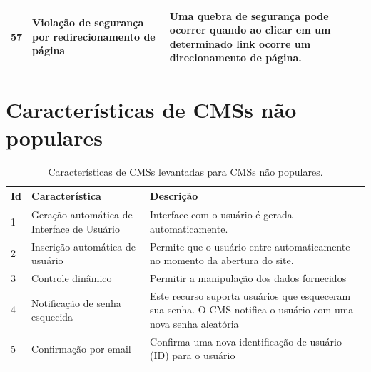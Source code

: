 \begin{apendicesenv}
\begin{landscape}
\begin{longtable}{|p{10pt}|p{220pt}|p{415pt}|}
 	 {\raggedright {57}}
 	  	 	 	 	 & {\raggedright {Violação de segurança por redirecionamento de página}}
 	  	 	 	 	 & {\raggedright {Uma quebra de segurança pode ocorrer quando ao clicar em um determinado link ocorre um direcionamento de página. \cite{Vasek2015} }}\\
 	  	 	 	 	\hline

	\end{longtable}

\section{Características de CMSs não populares}
\begin{longtable}{|p{10pt}|p{220pt}|p{430pt}|}
 	\caption{Características de CMSs levantadas para CMSs não populares.} 
 	\label{caracteristicas_CMS_não_popular}\\
 	\hline
 	 {\raggedright \textbf{Id}}
 	 & {\raggedright \textbf{Característica}}
 	 & {\raggedright \textbf{Descrição}}\\
 	\hline
 	{\raggedright {1}}
 	 	 & {\raggedright {Geração automática de Interface de Usuário}}
 	 	 & {\raggedright {Interface com o usuário é gerada automaticamente. \cite{Nath_Arora}}}\\
 	 	\hline
 	{\raggedright {2}}
 	 	 & {\raggedright {Inscrição automática de usuário}}
 	 	 & {\raggedright {Permite que o usuário entre automaticamente no momento da abertura do site.}\cite{Nath_Arora}}\\
 	 	\hline
 	{\raggedright {3}}
 	 	 & {\raggedright {Controle dinâmico}}
 	 	 & {\raggedright {Permitir a manipulação dos dados fornecidos \cite{Nath_Arora}}}\\
 	 	\hline
 	 	{\raggedright {4}}
 	 	 	 	 & {\raggedright {Notificação de senha esquecida}}
 	 	 	 	 & {\raggedright {Este recurso suporta usuários que esqueceram sua senha. O CMS notifica o usuário com uma nova senha aleatória} \cite{Nath_Arora}}\\
 	 	 	 	\hline
 	 {\raggedright {5}}
 	  	 	 	 	 & {\raggedright {Confirmação por email}}
 	  	 	 	 	 & {\raggedright {Confirma uma nova identificação de usuário (ID) para o usuário \cite{Nath_Arora}}}\\
 	  	 	 	 	\hline
 	  	 	 	 	

\end{longtable}
\end{landscape}
\end{apendicesenv}
